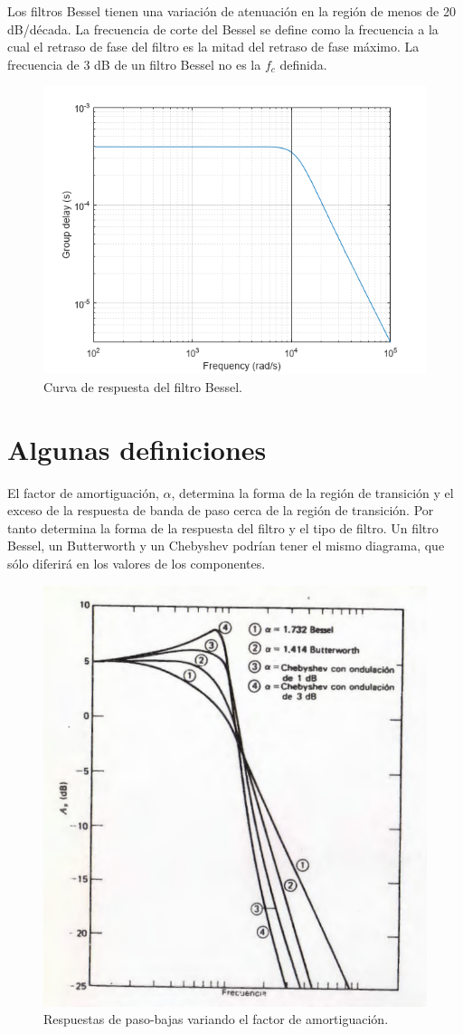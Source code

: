 Los filtros Bessel tienen una variación de atenuación en la región de menos de 20 dB/década. La frecuencia de corte del Bessel se define como la frecuencia a la cual el retraso de fase del filtro es la mitad del retraso de fase máximo. La frecuencia de 3 dB de un filtro Bessel no es la $f_c$ definida.

\begin{figure}[H]
    \centering
    \includegraphics[width=0.5\linewidth]{Imagenes/Filtros Bessel.png}
    \caption{Curva de respuesta del filtro Bessel.}
    \label{fig:Bessel}
\end{figure}

\section{Algunas definiciones}

El factor de amortiguación, $\alpha$, determina la forma de la región de transición y el exceso de la respuesta de banda de paso cerca de la región de transición. Por tanto determina la forma de la respuesta del filtro y el tipo de filtro. Un filtro Bessel, un Butterworth y un Chebyshev podrían tener el mismo diagrama, que sólo diferirá en los valores de los componentes.

\begin{figure}[H]
    \centering
    \includegraphics[width=0.5\linewidth]{Imagenes/Filtros Factor de Amortiguacion.png}
    \caption{Respuestas de paso-bajas variando el factor de amortiguación.}
\end{figure}

